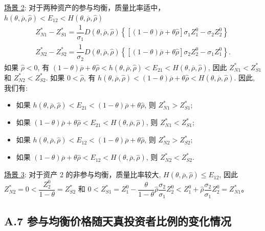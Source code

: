 \documentclass[10.0pt]{article}
\begin{document}
\underline{场景 2}: 对于两种资产的参与均衡，质量比率适中， $ h (\theta, \overline{\rho}, {\hat \rho}) < E_{1 2} < H (\theta, \overline{\rho}, {\hat \rho}) $
\begin{eqnarray*}
& Z_{N 1}^* - Z_{S 1}^* = \dfrac{1}{\sigma_1} D (\theta, \overline{\rho}, {\hat \rho}) \left\{ \left[ (1 - \theta) \overline{\rho} + \theta {\hat \rho} \right] \sigma_1 Z_1^0 - \sigma_2 Z_2^0 \right\} & \\
& Z_{N 2}^* - Z_{S 2}^* = \dfrac{1}{\sigma_2} D (\theta, \overline{\rho}, {\hat \rho}) \left\{ \left[ (1 - \theta) \overline{\rho} + \theta {\hat \rho} \right] \sigma_2 Z_2^0 - \sigma_1 Z_1^0 \right\}. &
\end{eqnarray*}
如果 $ {\hat \rho} < 0 $, 有 $ (1 - \theta) \overline{\rho} + \theta {\hat \rho} < h (\theta, \overline{\rho}, {\hat \rho}) < E_{2 1} < H (\theta, \overline{\rho}, {\hat \rho}) $, 因此 $ Z_{N 1}^* < Z_{S 1}^* $ 和 $ Z_{N 2}^* < Z_{S 2}^* $.
如果 $ 0 < {\hat \rho} $, 有 $ h (\theta, \overline{\rho}, {\hat \rho}) < (1 - \theta) \overline{\rho} + \theta {\hat \rho} < H (\theta, \overline{\rho}, {\hat \rho}) $. 因此, 我们有:
\begin{itemize}
\item 如果 $ h (\theta, \overline{\rho}, {\hat \rho}) < E_{2 1} < (1 - \theta) \overline{\rho} + \theta {\hat \rho} $, 则 $ Z_{N 1}^* > Z_{S 1}^* $;
\item 如果 $ (1 - \theta) \overline{\rho} + \theta {\hat \rho} < E_{2 1} < H (\theta, \overline{\rho}, {\hat \rho}) $, 则 $ Z_{N 1}^* < Z_{S 1}^* $;
\item 如果 $ h (\theta, \overline{\rho}, {\hat \rho}) < E_{1 2} < (1 - \theta) \overline{\rho} + \theta {\hat \rho} $, 则 $ Z_{N 2}^* > Z_{S 2}^* $;
\item 如果 $ (1 - \theta) \overline{\rho} + \theta {\hat \rho} < E_{1 2} < H (\theta, \overline{\rho}, {\hat \rho}) $, 则 $ Z_{N 2}^* < Z_{S 2}^* $.
\end{itemize}

\underline{场景 3}: 对于资产 2 的非参与均衡，质量比率较大, $ H (\theta, \overline{\rho}, {\hat \rho}) \leqslant E_{1 2} $, 因此 $ Z_{N 2}^* = 0 < \dfrac{Z_2^0}{1 - \theta} = Z_{S 2}^* $ 和 $ 0 < Z_{S 1}^* = Z_1^0 - \dfrac{\theta}{1 - \theta} {\hat \rho} \dfrac{\sigma_2}{\sigma_1} Z_2^0 < Z_1^0 + {\hat \rho} \dfrac{\sigma_2}{\sigma_1} Z_2^0 = Z_{N 1}^* $。

\subsection*{A.7 \quad 参与均衡价格随天真投资者比例的变化情况}
\end{document}
